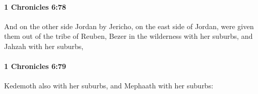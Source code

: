 		\paragraph{1 Chronicles 6:78} %
			\label{1CHRONICLES-6-78}

			And on the other side Jordan by Jericho, on the east side of Jordan, were given them out of the tribe of Reuben, Bezer in the wilderness with her suburbs, and Jahzah with her suburbs,


		\paragraph{1 Chronicles 6:79} %
			\label{1CHRONICLES-6-79}

			Kedemoth also with her suburbs, and Mephaath with her suburbs:


